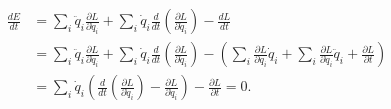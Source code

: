 \documentclass[a4paper,12pt]{report}
\begin{document}
\begin{equation}
	\begin{aligned} 
	\frac{dE}{dt} &= \sum_{i}^{}  \ddot{q} _{i} \frac{\partial L}{\partial \dot{q}_{i}  }  + \sum_{i}^{} \dot{q} _{i}  \frac{d}{dt} \left( \frac{\partial L}{\partial \dot{q}_{i}  } \right)   - \frac{dL}{dt} \\
	&= \sum_{i}^{}  \ddot{q} _{i} \frac{\partial L}{\partial \dot{q}_{i}  }  + \sum_{i}^{} \dot{q} _{i} \frac{d}{dt} \left( \frac{\partial L}{\partial \dot{q}_{i}  } \right) - \left( \sum_{i}^{} \frac{\partial L}{\partial q_{i} } \dot{q}_{i}  + \sum_{i}^{} \frac{\partial L}{\partial \dot{q}_{i} } \ddot{q}_{i}  + \frac{\partial L}{\partial t}     \right) \\
	&= \sum_{i}^{} \dot{q} _{i} \left( \frac{d}{dt} \left( \frac{\partial L}{\partial \dot{q} _{i} }   \right) - \frac{\partial L}{\partial \dot{q}_{i}  }  \right) - \frac{\partial L}{\partial t} = 0.
	\end{aligned} 
\end{equation}
\end{document}
